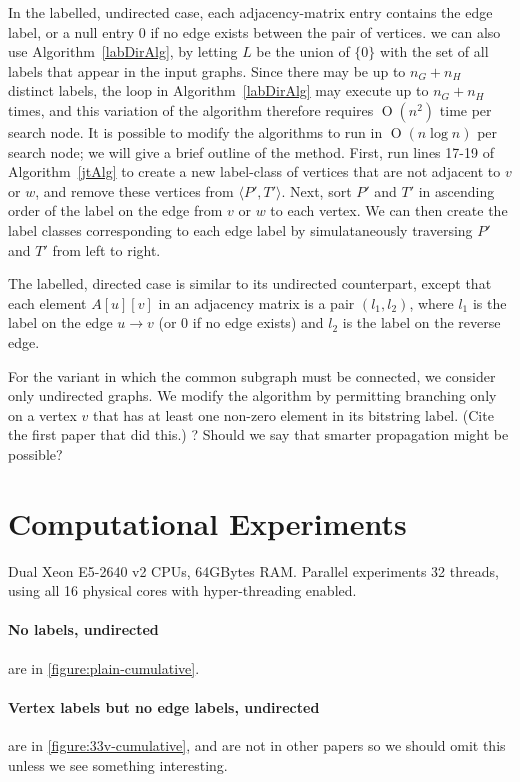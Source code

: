 \documentclass[letterpaper]{article}
\newcommand{\BigO}[1]{\ensuremath{\operatorname{O}\left(#1\right)}}
\begin{document}
In the labelled, undirected case, each adjacency-matrix entry contains the edge
label, or a null entry 0 if no edge exists between the pair of vertices.  we
can also use Algorithm~\ref{labDirAlg}, by letting $L$ be the union of $\{0\}$
with the set of all labels that appear in the input graphs. Since there may be
up to $n_G + n_H$ distinct labels, the loop in Algorithm~\ref{labDirAlg} may
execute up to $n_G + n_H$ times, and this variation of the algorithm therefore
requires $\BigO{n^2}$ time per search node.  It is possible to modify the
algorithms to run in $\BigO{n \log n}$ per search node; we will give a brief
outline of the method. First, run lines 17-19 of Algorithm~\ref{jtAlg} to
create a new label-class of vertices that are not adjacent to $v$ or $w$, and
remove these vertices from $\langle P',T' \rangle$. Next, sort $P'$ and $T'$ in
ascending order of the label on the edge from $v$ or $w$ to each vertex. We can
then create the label classes corresponding to each edge label by
simulataneously traversing $P'$ and $T'$ from left to right.

The labelled, directed case is similar to its undirected counterpart, except that
each element $A[u][v]$ in an adjacency matrix is a pair $(l_1, l_2)$, where
$l_1$ is the label on the edge $u \rightarrow v$ (or 0 if no edge exists) and $l_2$
is the label on the reverse edge.

For the variant in which the common subgraph must be connected, we consider
only undirected graphs. We modify the algorithm by permitting branching only on
a vertex $v$ that has at least one non-zero element in its bitstring label.
(Cite the first paper that did this.) ? Should we say that smarter propagation
might be possible?

\section{Computational Experiments}

Dual Xeon E5-2640 v2 CPUs, 64GBytes RAM. Parallel experiments 32 threads, using
all 16 physical cores with hyper-threading enabled.

\paragraph{No labels, undirected} are in \cref{figure:plain-cumulative}.

\paragraph{Vertex labels but no edge labels, undirected} are in \cref{figure:33v-cumulative}, and are not in other papers so we should omit this unless we see something interesting.
\end{document}
